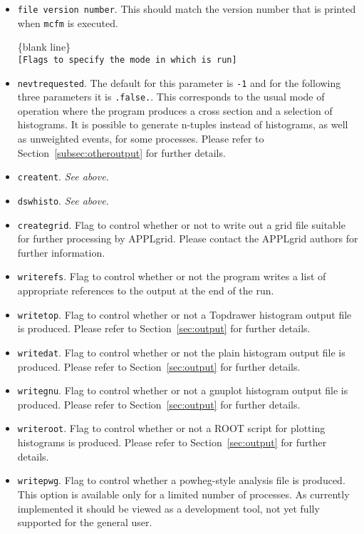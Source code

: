 \documentclass[12pt]{article}
\begin{document}
\begin{itemize}
\item {\tt file version number}. This should match the version number
that is printed when {\tt mcfm} is executed.

\begin{center}
\{blank line\} \\
{\tt [Flags to specify the mode in which \MCFM is run] }
\end{center}

\item {\tt nevtrequested}. The default for this parameter is {\tt -1} and for the following three
parameters it is {\tt .false.}.  This corresponds to the usual mode
of operation where the program produces a cross section and a selection of histograms.
It is possible to generate n-tuples instead of histograms,
as well as unweighted events, for some processes. Please refer to
Section~\ref{subsec:otheroutput} for further details.
\item {\tt creatent}. {\it See above.}
\item {\tt dswhisto}. {\it See above.}
\item {\tt creategrid}. Flag to control whether or not to write out a grid file suitable for
further processing by APPLgrid.  Please contact the APPLgrid authors for further information.
\item {\tt writerefs}. Flag to control whether or not the program writes a list
of appropriate references to the output at the end of the run. 
\item {\tt writetop}. Flag to control whether or not a Topdrawer histogram output file
is produced. Please refer to Section~\ref{sec:output} for further details.
\item {\tt writedat}. Flag to control whether or not the plain histogram output file
is produced. Please refer to Section~\ref{sec:output} for further details.
\item {\tt writegnu}. Flag to control whether or not a gnuplot histogram output file
is produced. Please refer to Section~\ref{sec:output} for further details.
\item {\tt writeroot}. Flag to control whether or not a ROOT script for plotting
histograms is produced. Please refer to Section~\ref{sec:output} for further details.
\item {\tt writepwg}. Flag to control whether a powheg-style analysis file is produced.
This option is available only for a limited number of processes. As currently implemented it
should be viewed as a development tool, not yet fully supported for the general user.


\end{itemize}
\end{document}
